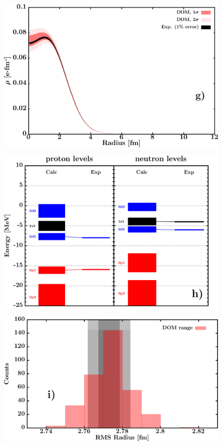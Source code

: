\documentclass[twocolumn,secnumarabic,amssymb, nobibnotes, aps, prl,
superscriptaddress, nobalancelastpage, draft]{revtex4}
\begin{document}
\begin{figure}[!htb]
\begin{minipage}{0.4\linewidth}
        \includegraphics[width=\linewidth]{figures/o18_chargeDensity.png}
        \label{DOM_o18_chargeDensity}
    \end{minipage}\hspace{6pt}
    \begin{minipage}{0.4\linewidth}
        \centering
        \includegraphics[width=\linewidth]{figures/o18_SPLevels.png}
        \label{DOM_o18_SPLevels}
    \end{minipage}
    \begin{minipage}{0.4\linewidth}
        \centering
        \includegraphics[width=\linewidth]{figures/o18_RMSRadius.png}

\end{minipage}
\end{figure}
\end{document}
